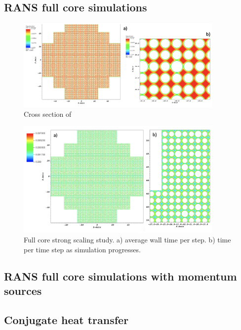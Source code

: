 \subsection{RANS full core simulations}
\label{sec:results2}

\begin{figure}[!ht]
\centering
\includegraphics[width=0.9\textwidth]{./figures/periodic_vz.png}
\caption{Cross section of}
\label{fig:vz}
\end{figure}

\begin{figure}[!ht]
\centering
\includegraphics[width=0.9\textwidth]{./figures/periodic_tke.png}
\caption{Full core strong scaling study. a) average wall time per step. b) time per time step as simulation progresses. }
\label{fig:tke}
\end{figure}


\subsection{RANS full core simulations with momentum sources}
\label{sec:results3}

\subsection{Conjugate heat transfer}
\label{sec:results4}
